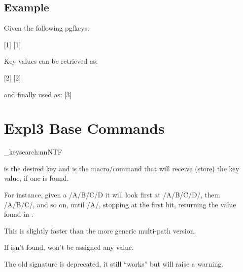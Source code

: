 \documentclass[10pt]{article}
\begin{document}

\subsection{Example}
Given the following pgfkeys:

[1]
[1]

Key values can be retrieved as:

[2]
[2]

and finally used as:
[3]

\section{Expl3 Base Commands}
\begin{codedescribe}[code,update=2025/05/26]{\pgfkeysearch_keysearch:nnNTF}
\begin{codesyntax}%
\end{codesyntax}
 is the desired key and  is the macro/command that will receive (store) the key value, if one is found.

For instance, given a  /A/B/C/D it will look first at /A/B/C/D/, them /A/B/C/, and so on, until /A/,
stopping at the first hit, returning the value found in .

This  is  slightly faster than the more generic multi-path version.
\end{codedescribe}
\begin{tsremark}
  If  isn't found,  won't be assigned any value.
\end{tsremark}
\begin{tsremark}
  The old signature  is deprecated, it still ``works'' but will raise a warning.
\end{tsremark}
\end{document}
